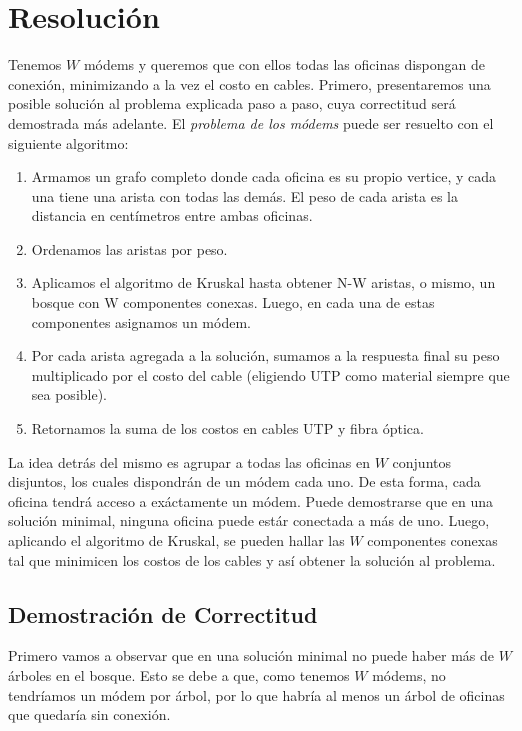 \section{Resolución}

Tenemos $W$ módems y queremos que con ellos todas las oficinas dispongan de conexión, minimizando a la vez el costo en cables. Primero, presentaremos una posible solución al problema explicada paso a paso, cuya correctitud será demostrada más adelante. El \textit{problema de los módems} puede ser resuelto con el siguiente algoritmo:

\begin{enumerate}
    \item Armamos un grafo completo donde cada oficina es su propio vertice, y cada una tiene una arista con todas las demás. El peso de cada arista es la distancia en centímetros entre ambas oficinas. 
    \item Ordenamos las aristas por peso.
    \item Aplicamos el algoritmo de Kruskal hasta obtener N-W aristas, o mismo, un bosque con W componentes conexas. Luego, en cada una de estas componentes asignamos un módem.
    \item Por cada arista agregada a la solución, sumamos a la respuesta final su peso multiplicado por el costo del cable (eligiendo UTP como material siempre que sea posible).
    \item Retornamos la suma de los costos en cables UTP y fibra óptica.
\end{enumerate}

La idea detrás del mismo es agrupar a todas las oficinas en $W$ conjuntos disjuntos, los cuales dispondrán de un módem cada uno. De esta forma, cada oficina tendrá acceso a exáctamente un módem. Puede demostrarse que en una solución minimal, ninguna oficina puede estár conectada a más de uno. Luego, aplicando el algoritmo de Kruskal, se pueden hallar las $W$ componentes conexas tal que minimicen los costos de los cables y así obtener la solución al problema. 

\vspace{1em}

\subsection{Demostración de Correctitud}
\vspace{1em}

Primero vamos a observar que en una solución minimal no puede haber más de $W$ árboles en el bosque. Esto se debe a que, como tenemos $W$ módems, no tendríamos un módem por árbol, por lo que habría al menos un árbol de oficinas que quedaría sin conexión. 

